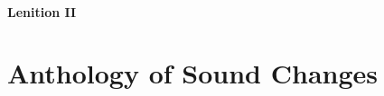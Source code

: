 \documentclass{report}[12pt]
\begin{document}
\subsubsection{Lenition II}\label{sec:lenition_2}

\begin{tcolorbox}

\end{tcolorbox}

\chapter{Anthology of Sound Changes}




\end{document}
